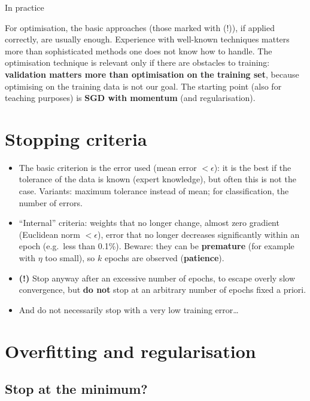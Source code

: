 \begin{boxtip}{In practice}

For optimisation, the basic approaches (those marked with (!)), if
applied correctly, are usually enough. Experience with well-known
techniques matters more than sophisticated methods one does not know
how to handle. The optimisation technique is relevant only if there are
obstacles to training: \textbf{validation matters more than
optimisation on the training set}, because optimising on the training
data is not our goal. The starting point (also for teaching purposes)
is \textbf{SGD with momentum} (and regularisation).

\end{boxtip}

\section{Stopping criteria}\label{criteri-di-arresto}

\begin{itemize}
\tightlist
\item
  The basic criterion is the error used (mean error \(< \epsilon\)): it
  is the best if the tolerance of the data is known (expert
  knowledge), but often this is not the case. Variants: maximum
  tolerance instead of mean; for classification, the number of errors.
\item
  ``Internal'' criteria: weights that no longer change, almost zero
  gradient (Euclidean norm \(< \epsilon\)), error that no longer
  decreases significantly within an epoch (e.g.\ less than 0.1\%).
  Beware: they can be \textbf{premature} (for example with \(\eta\) too
  small), so \(k\) epochs are observed (\textbf{patience}).
\item
  \textbf{(!)} Stop anyway after an excessive number of epochs, to
  escape overly slow convergence, but \textbf{do not} stop at an
  arbitrary number of epochs fixed a priori.
\item
  And do not necessarily stop with a very low training error\ldots{}
\end{itemize}

\section{Overfitting and
regularisation}\label{overfitting-e-regolarizzazione}

\subsection{Stop at the minimum?}\label{fermarsi-al-minimo}

